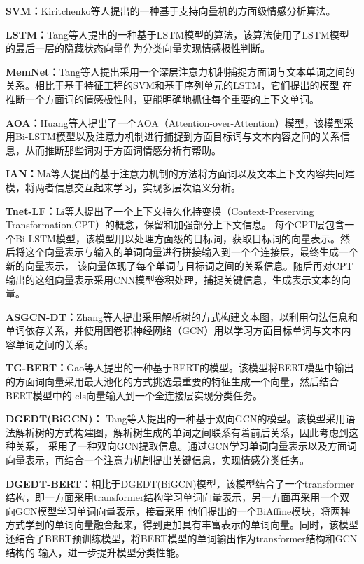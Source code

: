 \textbf{SVM：}Kiritchenko等人提出的一种基于支持向量机的方面级情感分析算法。

\textbf{LSTM：}Tang等人提出的一种基于LSTM模型的算法，该算法使用了LSTM模型的最后一层的隐藏状态向量作为分类向量实现情感极性判断。

\textbf{MemNet：}Tang等人提出采用一个深层注意力机制捕捉方面词与文本单词之间的关系。相比于基于特征工程的SVM和基于序列单元的LSTM，它们提出的模型
在推断一个方面词的情感极性时，更能明确地抓住每个重要的上下文单词。

\textbf{AOA：}Huang等人提出了一个AOA（Attention-over-Attention）模型，该模型采用Bi-LSTM模型以及注意力机制进行捕捉到方面目标词与文本内容之间的关系信息，从而推断那些词对于方面词情感分析有帮助。

\textbf{IAN：}Ma等人提出的基于注意力机制的方法将方面词以及文本上下文内容共同建模，将两者信息交互起来学习，实现多层次语义分析。

\textbf{Tnet-LF：}Li等人提出了一个上下文持久化持变换（Context-Preserving Transformation,CPT）的概念，保留和加强部分上下文信息。
每个CPT层包含一个Bi-LSTM模型，该模型用以处理方面级的目标词，获取目标词的向量表示。然后将这个向量表示与输入的单词向量进行拼接输入到一个全连接层，最终生成一个新的向量表示，
该向量体现了每个单词与目标词之间的关系信息。随后再对CPT输出的这组向量表示采用CNN模型卷积处理，捕捉关键信息，生成表示文本的向量。

\textbf{ASGCN-DT：}Zhang等人提出采用解析树的方式构建文本图，以利用句法信息和单词依存关系，并使用图卷积神经网络（GCN）用以学习方面目标单词与文本内容单词之间的关系。

\textbf{TG-BERT：}Gao等人提出的一种基于BERT的模型。该模型将BERT模型中输出的方面词向量采用最大池化的方式挑选最重要的特征生成一个向量，然后结合BERT模型中的
cls向量输入到一个全连接层实现分类任务。

\textbf{DGEDT(BiGCN)：} Tang等人提出的一种基于双向GCN的模型。该模型采用语法解析树的方式构建图，解析树生成的单词之间联系有着前后关系，因此考虑到这种关系，
采用了一种双向GCN提取信息。通过GCN学习单词向量表示以及方面词向量表示，再结合一个注意力机制提出关键信息，实现情感分类任务。

\textbf{DGEDT-BERT：}相比于DGEDT(BiGCN)模型，该模型结合了一个transformer结构，即一方面采用transformer结构学习单词向量表示，另一方面再采用一个双向GCN模型学习单词向量表示，接着采用
他们提出的一个BiAffine模块，将两种方式学到的单词向量融合起来，得到更加具有丰富表示的单词向量。同时，该模型还结合了BERT预训练模型，将BERT模型的单词输出作为transformer结构和GCN结构的
输入，进一步提升模型分类性能。

